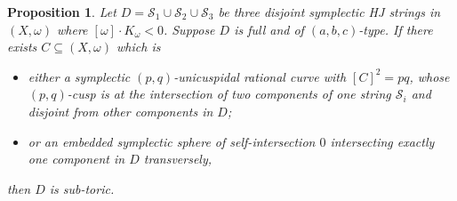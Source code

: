 \documentclass[11pt]{article}
\newtheorem{proposition}[theorem]{Proposition}
\theoremstyle{definition}
\theoremstyle{remark}
\newcommand{\st}{\mathcal{S}}
\begin{document}
\begin{proposition}\label{prop:recoverfromruling}
  Let $D=\st_1\cup\st_2\cup\st_3$ be three disjoint symplectic HJ strings in $(X,\omega)$ where $[\omega]\cdot K_\omega<0$. Suppose $D$ is full and of $(a,b,c)$-type. If there exists $C\subseteq (X,\omega)$ which is
\begin{itemize}[nosep]
  \item either a symplectic $(p,q)$-unicuspidal rational curve with $[C]^2=pq$, whose $(p,q)$-cusp is at the intersection of two components of one string $\st_i$ and disjoint from other components in $D$;
  \item or an embedded symplectic sphere of self-intersection $0$ intersecting exactly one component in $D$ transversely,
\end{itemize} 
then $D$ is sub-toric.
\end{proposition}
\end{document}
